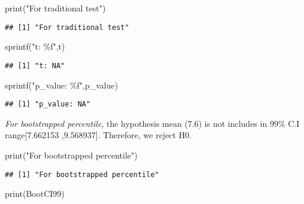 \documentclass[
]{article}
\newenvironment{Shaded}{\begin{snugshade}}{\end{snugshade}}
\newcommand{\FunctionTok}[1]{\textcolor[rgb]{0.00,0.00,0.00}{#1}}
\newcommand{\NormalTok}[1]{#1}
\newcommand{\StringTok}[1]{\textcolor[rgb]{0.31,0.60,0.02}{#1}}
\begin{document}
\begin{Shaded}
\begin{Highlighting}[]
\FunctionTok{print}\NormalTok{(}\StringTok{"For traditional test"}\NormalTok{)}
\end{Highlighting}
\end{Shaded}

\begin{verbatim}
## [1] "For traditional test"
\end{verbatim}

\begin{Shaded}
\begin{Highlighting}[]
\FunctionTok{sprintf}\NormalTok{(}\StringTok{"t: \%f"}\NormalTok{,t)}
\end{Highlighting}
\end{Shaded}

\begin{verbatim}
## [1] "t: NA"
\end{verbatim}

\begin{Shaded}
\begin{Highlighting}[]
\FunctionTok{sprintf}\NormalTok{(}\StringTok{"p\_value: \%f"}\NormalTok{,p\_value)}
\end{Highlighting}
\end{Shaded}

\begin{verbatim}
## [1] "p_value: NA"
\end{verbatim}

\emph{For bootstrapped percentile}, the hypothesis mean (7.6) is not
includes in 99\% C.I range{[}7.662153 ,9.568937{]}. Therefore, we reject
H0.

\begin{Shaded}
\begin{Highlighting}[]
\FunctionTok{print}\NormalTok{(}\StringTok{"For bootstrapped percentile"}\NormalTok{)}
\end{Highlighting}
\end{Shaded}

\begin{verbatim}
## [1] "For bootstrapped percentile"
\end{verbatim}

\begin{Shaded}
\begin{Highlighting}[]
\FunctionTok{print}\NormalTok{(BootCI99)}
\end{Highlighting}
\end{Shaded}
\end{document}
